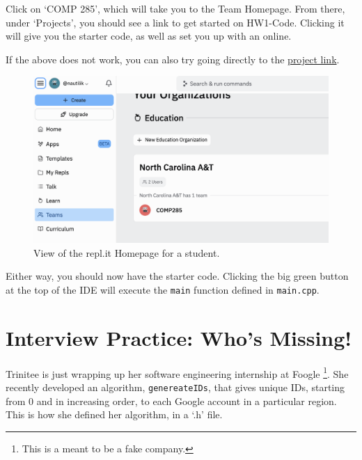 \documentclass [12pt]{article}
\begin{document}
Click on `COMP 285', which will take you to the Team Homepage. From there, under `Projects', you should see a link to get started on HW1-Code. Clicking it will give you the starter code, as well as set you up with an online. 

If the above does not work, you can also try going directly to the \href{https://replit.com/team/COMP285/HW1-Code}{project link}.

\begin{figure}[h!]
\centering
\includegraphics[scale=0.5]{replit}
\caption{View of the repl.it Homepage for a student.}
\label{fig:replit_homepage}
\end{figure}

Either way, you should now have the starter code. Clicking the big green button at the top of the IDE will execute the \texttt{main} function defined in \texttt{main.cpp}.




\pagebreak
\section{Interview Practice: Who's Missing!}

 Trinitee is just wrapping up her software engineering internship at Foogle \footnote{This is a meant to be a fake company.}. She recently developed an algorithm, \texttt{genereateIDs}, that gives unique IDs, starting from $0$ and in increasing order, to each Google account in a particular region. This is how she defined her algorithm, in a `.h' file.
\end{document}
